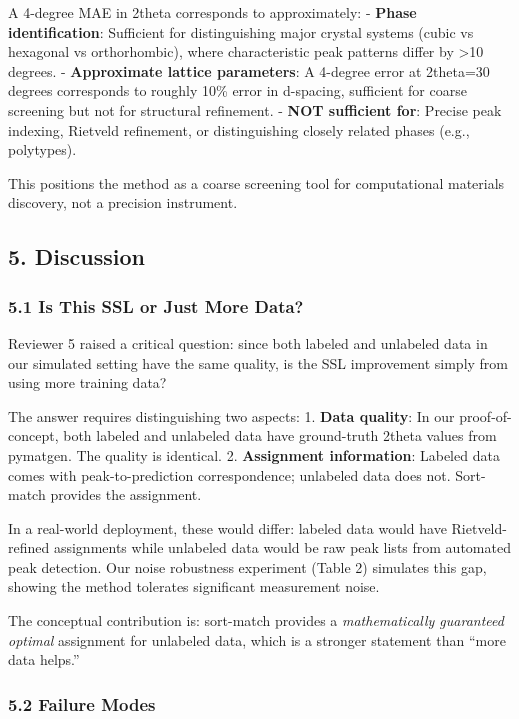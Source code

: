 \documentclass[
  11pt,
]{article}
\begin{document}
A 4-degree MAE in 2theta corresponds to approximately: - \textbf{Phase
identification}: Sufficient for distinguishing major crystal systems
(cubic vs hexagonal vs orthorhombic), where characteristic peak patterns
differ by \textgreater10 degrees. - \textbf{Approximate lattice
parameters}: A 4-degree error at 2theta=30 degrees corresponds to
roughly 10\% error in d-spacing, sufficient for coarse screening but not
for structural refinement. - \textbf{NOT sufficient for}: Precise peak
indexing, Rietveld refinement, or distinguishing closely related phases
(e.g., polytypes).

This positions the method as a coarse screening tool for computational
materials discovery, not a precision instrument.

\subsection{5. Discussion}\label{discussion}

\subsubsection{5.1 Is This SSL or Just More
Data?}\label{is-this-ssl-or-just-more-data}

Reviewer 5 raised a critical question: since both labeled and unlabeled
data in our simulated setting have the same quality, is the SSL
improvement simply from using more training data?

The answer requires distinguishing two aspects: 1. \textbf{Data
quality}: In our proof-of-concept, both labeled and unlabeled data have
ground-truth 2theta values from pymatgen. The quality is identical. 2.
\textbf{Assignment information}: Labeled data comes with
peak-to-prediction correspondence; unlabeled data does not. Sort-match
provides the assignment.

In a real-world deployment, these would differ: labeled data would have
Rietveld-refined assignments while unlabeled data would be raw peak
lists from automated peak detection. Our noise robustness experiment
(Table 2) simulates this gap, showing the method tolerates significant
measurement noise.

The conceptual contribution is: sort-match provides a
\emph{mathematically guaranteed optimal} assignment for unlabeled data,
which is a stronger statement than ``more data helps.''

\subsubsection{5.2 Failure Modes}\label{failure-modes}
\end{document}
